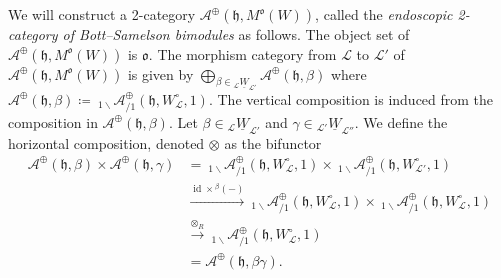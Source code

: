 \documentclass{amsart}
\newcommand{\scrA}{\mathcal{A}}
\newcommand{\scrL}{\mathcal{L}}
\DeclareMathOperator{\id}{id}
\newcommand{\fr}[1]{\mathfrak{#1}}
\newcommand{\Amon}[2]{\:_{#1 \backslash} \mathcal{A}_{/ #2} }
\newcommand{\uW}[2]{{}_{#1}\underline{W}_{#2}}
\theoremstyle{definition}
\numberwithin{equation}{subsection}
\begin{document}
We will construct a 2-category $\scrA^{\oplus} (\fr{h}, M^{\fr{o}} (W))$, called the \emph{endoscopic 2-category of Bott--Samelson bimodules} as follows. The object set of $\scrA^{\oplus} (\fr{h}, M^{\fr{o}} (W))$ is $\fr{o}$.
The morphism category from $\scrL$ to $\scrL'$ of $\scrA^{\oplus} (\fr{h}, M^{\fr{o}} (W))$ is given by $\bigoplus_{\beta \in \uW{\scrL}{\scrL'}} \scrA^{\oplus} (\fr{h}, \beta)$ where $\scrA^{\oplus} (\fr{h}, \beta) \coloneq \Amon{1}{1}^{\oplus} (\fr{h}, W_{\scrL}^{\circ}, 1)$.
The vertical composition is induced from the composition in $\scrA^{\oplus} (\fr{h}, \beta)$. Let $\beta \in \uW{\scrL}{\scrL'}$ and $\gamma \in \uW{\scrL'}{\scrL''}$. 
We define the horizontal composition, denoted $\otimes$ as the bifunctor
\begin{align*}
    \scrA^{\oplus} (\fr{h}, \beta) \times \scrA^{\oplus} (\fr{h}, \gamma) &= \Amon{1}{1}^{\oplus} (\fr{h}, W_{\scrL}^{\circ}, 1) \times \Amon{1}{1}^{\oplus} (\fr{h}, W_{\scrL'}^{\circ}, 1) \\
    &\stackrel{\id \times {}^{\beta} (-) }{\longrightarrow} \Amon{1}{1}^{\oplus} (\fr{h}, W_{\scrL}^{\circ}, 1) \times \Amon{1}{1}^{\oplus} (\fr{h}, W_{\scrL}^{\circ}, 1) \\
    &\stackrel{\otimes_R}{\to} \Amon{1}{1}^{\oplus} (\fr{h}, W_{\scrL}^{\circ}, 1) \\
    &= \scrA^{\oplus} (\fr{h}, \beta \gamma).
\end{align*}
\end{document}
